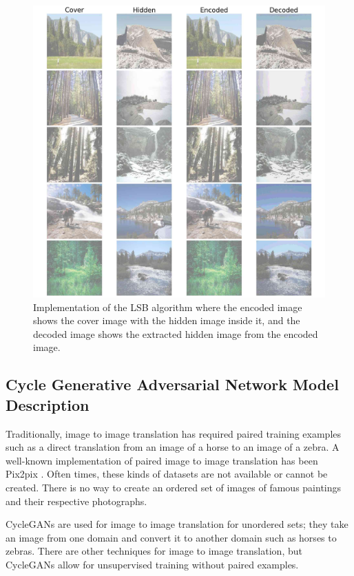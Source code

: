 \documentclass[conference]{IEEEtran}
\begin{document}
\begin{figure}[ht]
    \centering
    \includegraphics[scale=0.13,clip=false]{images/LSB.jpg}
    \caption{Implementation of the LSB algorithm where the encoded image shows the cover image with the hidden image inside it, and the decoded image shows the extracted hidden image from the encoded image.}
    \label{fig:LSB}
\end{figure}

\subsection{Cycle Generative Adversarial Network Model Description}
Traditionally, image to image translation has required paired training examples such as a direct translation from an image of a horse to an image of a zebra. A well-known implementation of paired image to image translation has been Pix2pix \cite{isola_image--image_2018}. Often times, these kinds of datasets are not available or cannot be created. There is no way to create an ordered set of images of famous paintings and their respective photographs. 

CycleGANs are used for image to image translation for unordered sets; they take an image from one domain and convert it to another domain such as horses to zebras. There are other techniques for image to image translation, but CycleGANs allow for unsupervised training without paired examples. 
\end{document}
